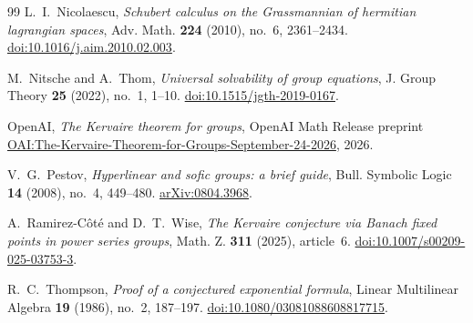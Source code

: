 \begin{thebibliography}{99}
L.~I.~Nicolaescu,
\emph{Schubert calculus on the Grassmannian of hermitian lagrangian spaces},
Adv. Math. \textbf{224} (2010), no.~6, 2361--2434.
\href{https://doi.org/10.1016/j.aim.2010.02.003}{doi:10.1016/j.aim.2010.02.003}.

M.~Nitsche and A.~Thom,
\emph{Universal solvability of group equations},
J. Group Theory \textbf{25} (2022), no.~1, 1--10.
\href{https://doi.org/10.1515/jgth-2019-0167}{doi:10.1515/jgth-2019-0167}.

OpenAI,
\emph{The Kervaire theorem for groups},
OpenAI Math Release preprint
\href{https://github.com/openai/math/blob/main/preprints/The-Kervaire-Theorem-for-Groups-September-24-2026/The-Kervaire-Theorem-for-Groups-September-24-2026.pdf}{OAI:The-Kervaire-Theorem-for-Groups-September-24-2026},
2026.

V.~G.~Pestov,
\emph{Hyperlinear and sofic groups: a brief guide},
Bull. Symbolic Logic \textbf{14} (2008), no.~4, 449--480.
\href{https://arxiv.org/abs/0804.3968}{arXiv:0804.3968}.

A.~Ramirez-C\^ot\'e and D.~T.~Wise,
\emph{The Kervaire conjecture via Banach fixed points in power series groups},
Math. Z. \textbf{311} (2025), article~6.
\href{https://doi.org/10.1007/s00209-025-03753-3}{doi:10.1007/s00209-025-03753-3}.

R.~C.~Thompson,
\emph{Proof of a conjectured exponential formula},
Linear Multilinear Algebra \textbf{19} (1986), no.~2, 187--197.
\href{https://doi.org/10.1080/03081088608817715}{doi:10.1080/03081088608817715}.

\end{thebibliography}
